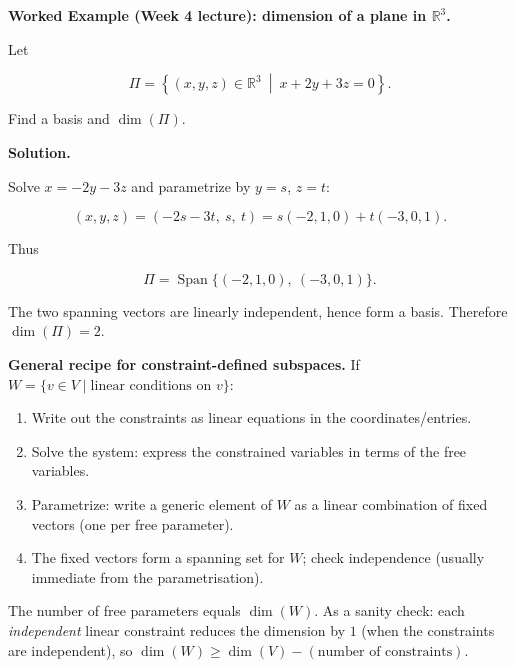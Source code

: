 \begin{examplebox}

\textbf{Worked Example (Week 4 lecture): dimension of a plane in $\mathbb{R}^3$.}

Let

\[
\Pi=\left\{(x,y,z)\in\mathbb{R}^3 \ \middle|\ x+2y+3z=0\right\}.
\]

Find a basis and $\dim(\Pi)$.

\medskip

\textbf{Solution.}

Solve $x=-2y-3z$ and parametrize by $y=s$, $z=t$:

\[
(x,y,z)=(-2s-3t,\ s,\ t)=s(-2,1,0)+t(-3,0,1).
\]

Thus

\[
\Pi=\operatorname{Span}\{(-2,1,0),\ (-3,0,1)\}.
\]

The two spanning vectors are linearly independent, hence form a basis. Therefore $\dim(\Pi)=2$.

\end{examplebox}

\begin{policynote}
\textbf{General recipe for constraint-defined subspaces.}
If $W=\{v\in V\mid \text{linear conditions on }v\}$:
\begin{enumerate}[leftmargin=*]
\item Write out the constraints as linear equations in the coordinates/entries.
\item Solve the system: express the constrained variables in terms of the free variables.
\item Parametrize: write a generic element of $W$ as a linear combination of fixed vectors (one per free parameter).
\item The fixed vectors form a spanning set for $W$; check independence (usually immediate from the parametrisation).
\end{enumerate}
The number of free parameters equals $\dim(W)$.
As a sanity check: each \emph{independent} linear constraint reduces the dimension by $1$ (when the constraints are independent), so $\dim(W)\ge\dim(V)-(\text{number of constraints})$.
\end{policynote}

